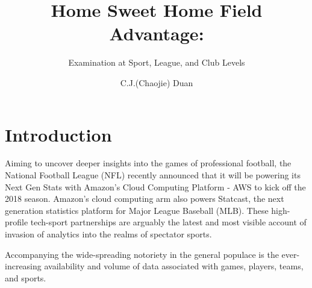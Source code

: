 \documentclass[USenglish]{article}
\begin{document}

  \author*[1]{C.J.(Chaojie) Duan}
  \title{Home Sweet Home Field Advantage:}
  \subtitle{Examination at Sport, League, and Club Levels}
\maketitle

\section{Introduction} 


Aiming to uncover deeper insights into the games of professional football, the National Football League (NFL) recently announced that it will be powering its Next Gen Stats with Amazon's Cloud Computing Platform - AWS to kick off the 2018 season. %
Amazon’s cloud computing arm also powers Statcast, the next generation statistics platform for Major League Baseball (MLB). These high-profile tech-sport partnerships are arguably the latest and most visible account of invasion of analytics into the realms of spectator sports.

Accompanying the wide-spreading notoriety in the general populace is the ever-increasing availability and volume of data associated with games, players, teams, and sports.   

\end{document}
